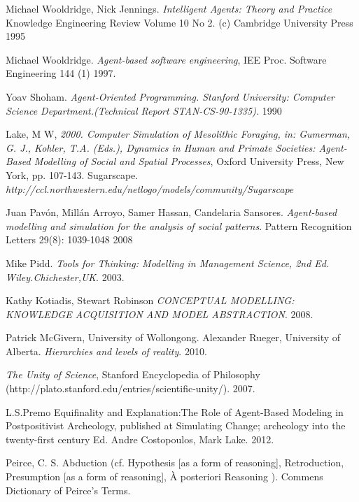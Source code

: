 \documentclass[11pt,oneside,a4paper,openright]{report}
\begin{document}
\begin{thebibliography}{13}
	 Michael Wooldridge, Nick Jennings.
	\emph{Intelligent Agents: Theory and Practice}  Knowledge Engineering Review Volume 10 No 2. (c) Cambridge
	University Press 
	1995

	 Michael Wooldridge.
	\emph{Agent-based software engineering}, IEE Proc. Software Engineering 144 (1) 
	1997.

	Yoav Shoham.
	\emph{Agent-Oriented Programming. Stanford University: Computer Science Department.(Technical Report STAN-CS-90-1335).}
	1990 

	Lake, M W,
	\emph{2000. Computer Simulation of Mesolithic Foraging, in: Gumerman, G. J., Kohler, T.A. (Eds.), Dynamics in Human and Primate Societies: Agent-Based Modelling of Social and Spatial Processes}, Oxford University Press, New York, pp. 107-143.
	Sugarscape.
	\emph{http://ccl.northwestern.edu/netlogo/models/community/Sugarscape}

	Juan Pavón, Millán Arroyo, Samer Hassan, Candelaria Sansores.
	\emph{Agent-based modelling and simulation for the analysis of social patterns}. Pattern Recognition Letters 29(8): 1039-1048 
	2008

	Mike Pidd.
	\emph{Tools for Thinking: Modelling in Management Science, 2nd Ed. Wiley.Chichester,UK}.
	2003.

	Kathy Kotiadis, Stewart Robinson
	\emph{CONCEPTUAL MODELLING: KNOWLEDGE ACQUISITION AND MODEL ABSTRACTION}.
	2008.

	Patrick McGivern, University of Wollongong.
	Alexander Rueger, University of Alberta.
	\emph{Hierarchies and levels of reality}.
	2010.

	\emph{The Unity of Science}, Stanford Encyclopedia of Philosophy (http://plato.stanford.edu/entries/scientific-unity/).
	2007.

	L.S.Premo
	Equifinality and Explanation:The Role of Agent-Based Modeling in Postpositivist Archeology, published at Simulating Change; archeology into the twenty-first century Ed. Andre Costopoulos, Mark Lake.
	2012.

	Peirce, C. S. 
	Abduction (cf. Hypothesis [as a form of reasoning], Retroduction, Presumption [as a form of reasoning], À posteriori Reasoning ). Commens Dictionary of Peirce's Terms.
	

\end{thebibliography}
\end{document}

